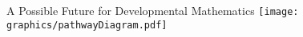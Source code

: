 \documentclass{beamer}
\begin{document}

\begin{frame}{A Possible Future for Developmental Mathematics}
	\texttt{[image: graphics/pathwayDiagram.pdf]}
\end{frame}
\end{document}

